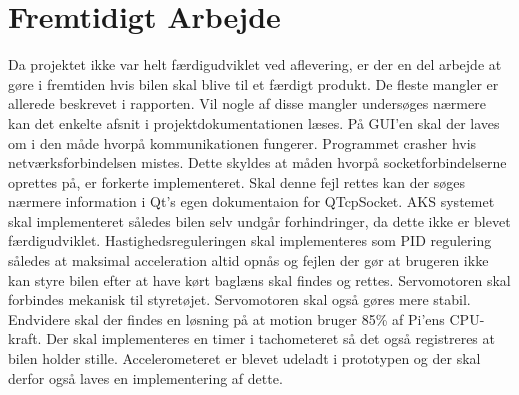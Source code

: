 \chapter{Fremtidigt Arbejde} \label{ch:Fremtidigt_arbejde}

Da projektet ikke var helt færdigudviklet ved aflevering, er der en del arbejde at gøre i fremtiden hvis bilen skal blive til et færdigt produkt. 
De fleste mangler er allerede beskrevet i rapporten. Vil nogle af disse mangler undersøges nærmere kan det enkelte afsnit i projektdokumentationen læses. 
På GUI'en skal der laves om i den måde hvorpå kommunikationen fungerer. 
Programmet crasher hvis netværksforbindelsen mistes. Dette skyldes at måden hvorpå socketforbindelserne oprettes på, er forkerte implementeret. 
Skal denne fejl rettes kan der søges nærmere information i Qt's egen dokumentaion for QTcpSocket\cite{lib:qtcpsocket}.
AKS systemet skal implementeret således bilen selv undgår forhindringer, da dette ikke er blevet færdigudviklet.
Hastighedsreguleringen skal implementeres som PID regulering således at maksimal acceleration altid opnås og fejlen der gør at brugeren ikke kan styre bilen efter at have kørt baglæns skal findes og rettes. 
Servomotoren skal forbindes mekanisk til styretøjet. Servomotoren skal også gøres mere stabil.
Endvidere skal der findes en løsning på at motion bruger 85\% af Pi'ens CPU-kraft. 
Der skal implementeres en timer i tachometeret så det også registreres at bilen holder stille.
Accelerometeret er blevet udeladt i prototypen og der skal derfor også laves en implementering af dette.